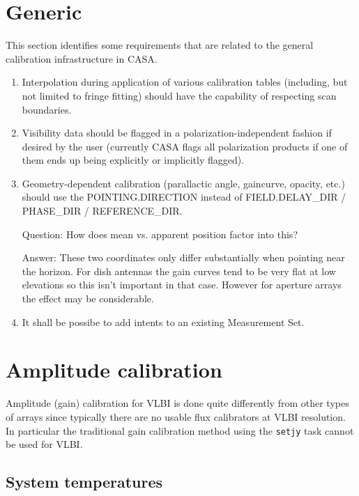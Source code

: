 \documentclass[11pt,a4paper]{article}
\begin{document}
\section{Generic}

This section identifies some requirements that are related to the
general calibration infrastructure in CASA.

\begin{enumerate}[seclist]

\item Interpolation during application of various calibration tables
  (including, but not limited to fringe fitting) should have the
  capability of respecting scan boundaries.

\item Visibility data should be flagged in a polarization-independent
  fashion if desired by the user (currently CASA flags all
  polarization products if one of them ends up being explicitly or
  implicitly flagged).

\item Geometry-dependent calibration (parallactic angle, gaincurve,
  opacity, etc.) should use the POINTING.DIRECTION instead of
  FIELD.DELAY{\_}DIR / PHASE{\_}DIR / REFERENCE{\_}DIR.

  Question: How does mean vs. apparent position factor into this?

  Answer: These two coordinates only differ substantially when
  pointing near the horizon.  For dish antennas the gain curves tend
  to be very flat at low elevations so this isn't important in that
  case.  However for aperture arrays the effect may be considerable.

\item It shall be possibe to add intents to an existing Measurement Set.
  
\end{enumerate}


\section{Amplitude calibration}

Amplitude (gain) calibration for VLBI is done quite differently from
other types of arrays since typically there are no usable flux
calibrators at VLBI resolution.  In particular the traditional gain
calibration method using the \texttt{setjy} task cannot be used for
VLBI.


\subsection{System temperatures}
\end{document}
